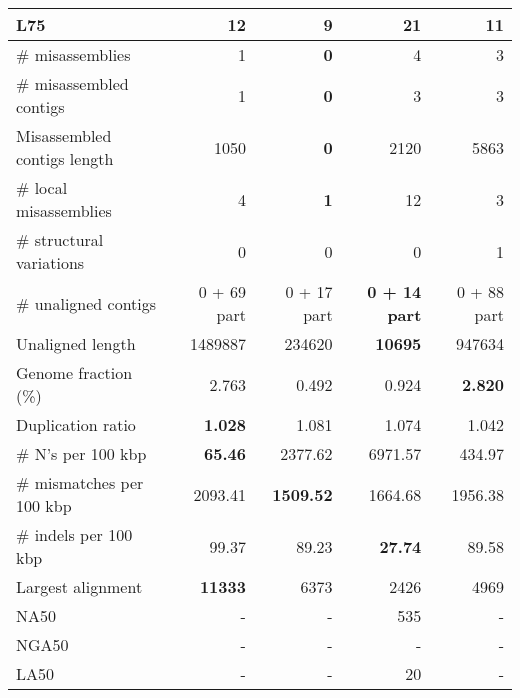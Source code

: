 \documentclass[12pt,a4paper]{article}
\begin{document}
\begin{table}[ht]
\begin{center}
\begin{tabular}{|l*{4}{|r}|}
L75 & 12 & {\bf 9} & 21 & 11 \\ \hline
\# misassemblies & 1 & {\bf 0} & 4 & 3 \\ \hline
\# misassembled contigs & 1 & {\bf 0} & 3 & 3 \\ \hline
Misassembled contigs length & 1050 & {\bf 0} & 2120 & 5863 \\ \hline
\# local misassemblies & 4 & {\bf 1} & 12 & 3 \\ \hline
\# structural variations & 0 & 0 & 0 & 1 \\ \hline
\# unaligned contigs & 0 + 69 part & 0 + 17 part & {\bf 0 + 14 part} & 0 + 88 part \\ \hline
Unaligned length & 1489887 & 234620 & {\bf 10695} & 947634 \\ \hline
Genome fraction (\%) & 2.763 & 0.492 & 0.924 & {\bf 2.820} \\ \hline
Duplication ratio & {\bf 1.028} & 1.081 & 1.074 & 1.042 \\ \hline
\# N's per 100 kbp & {\bf 65.46} & 2377.62 & 6971.57 & 434.97 \\ \hline
\# mismatches per 100 kbp & 2093.41 & {\bf 1509.52} & 1664.68 & 1956.38 \\ \hline
\# indels per 100 kbp & 99.37 & 89.23 & {\bf 27.74} & 89.58 \\ \hline
Largest alignment & {\bf 11333} & 6373 & 2426 & 4969 \\ \hline
NA50 & - & - & 535 & - \\ \hline
NGA50 & - & - & - & - \\ \hline
LA50 & - & - & 20 & - \\ \hline
\end{tabular}
\end{center}
\end{table}
\end{document}
